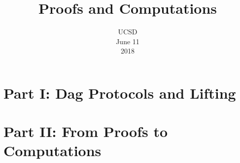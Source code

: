 \documentclass[english, xcolor = {table}]{beamer}
\title[Proofs and Computations]{
	Proofs and Computations
}
\author[Sokolov D.]{
	\texorpdfstring{
		\begin{columns}
    		\column{0.45\linewidth}
            \centering
            \rbox{
                Ankit Garg\\
                Microsoft Research
            }
            \column{0.45\linewidth}
            \centering
            \rbox{
                Mika G{\"{o}}{\"{o}}s\\
                Harvard University
            }
        \end{columns}
        \vspace{0.5cm}
        \begin{columns}
            \column{0.45\linewidth}
            \centering
            \rbox{
                Pritish Kamath\\
                MIT
            }
            \column{0.45\linewidth}
            \centering
            \rbox{
       	        Dmitry Sokolov\\
            	KTH University
            }
        \end{columns}
    }{
        temp
    }
}
\date{UCSD\\
	June 11\\
	2018
}
\begin{document}
	\maketitle

    \section{Part I: Dag Protocols and Lifting}

    
    
    
    

    \section{Part II: From Proofs to Computations}

    
    
    
\end{document}

